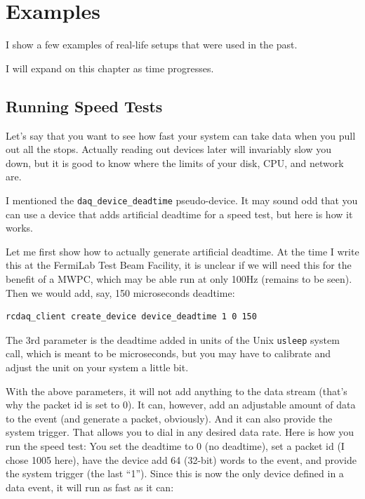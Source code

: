\documentclass{article}[11pt]
\begin{document}
\appendix

\section{Examples}

I show a few examples of real-life setups that were used in the past.

I will expand on this chapter as time progresses.

\subsection{Running Speed Tests}
\label{speedtests}
Let's say that you want to see how fast your system can take data when
you pull out all the stops. Actually reading out devices later will
invariably slow you down, but it is good to know where the limits of
your disk, CPU, and network are.

I mentioned the \verb|daq_device_deadtime| pseudo-device. It may sound
odd that you can use a device that adds artificial deadtime for a
speed test, but here is how it works.

Let me first show how to actually generate artificial deadtime. At the
time I write this at the FermiLab Test Beam Facility, it is unclear if
we will need this for the benefit of a MWPC, which may be able run at
only 100Hz (remains to be seen). Then we would add, say, 150 microseconds
deadtime:

\begin{verbatim}
rcdaq_client create_device device_deadtime 1 0 150
\end{verbatim}

The 3rd parameter is the deadtime added in units of the Unix \verb|usleep|
system call, which is meant to be microseconds, but you may have to calibrate and 
adjust the unit on your system a little bit.  

With the above parameters, it will not add anything to the data stream
(that's why the packet id is set to 0). It can, however, add an
adjustable amount of data to the event (and generate a packet,
obviously). And it can also provide the system trigger. That allows
you to dial in any desired data rate. Here is how you run the speed
test: You set the deadtime to 0 (no deadtime), set a packet id (I
chose 1005 here), have the device add 64 (32-bit) words to the event,
and provide the system trigger (the last ``1''). Since this is now the
only device defined in a data event, it will run as fast as it can:
\end{document}
